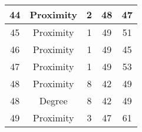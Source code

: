 \documentclass[results.tex]{subfiles}
\begin{document}
\begin{center}
\begin{tabular}{| c || c | c | c | c |}
    \hline
    44 & Proximity & 2 & 48 & 47 \\ 
    \hline
    45 & Proximity & 1 & 49 & 51 \\ 
    \hline
    46 & Proximity & 1 & 49 & 45 \\ 
    \hline
    47 & Proximity & 1 & 49 & 53 \\ 
    \hline
    48 & Proximity & 8 & 42 & 49 \\ 
    \hline
    48 & Degree & 8 & 42 & 49 \\ 
    \hline
    49 & Proximity & 3 & 47 & 61 \\ 
    \hline   \end{tabular}
\end{center}
\end{document}
